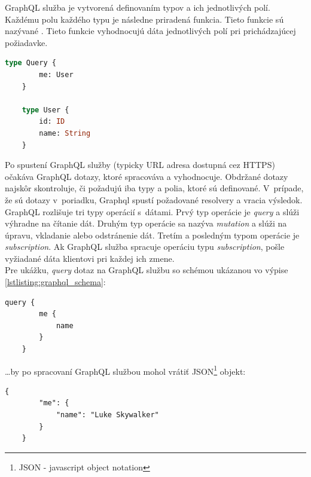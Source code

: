 \noindent GraphQL služba je vytvorená definovaním typov a ich jednotlivých polí. Každému polu každého typu je následne priradená funkcia. \cite{GraphQL} Tieto funkcie sú nazývané . Tieto funkcie vyhodnocujú dáta jednotlivých polí pri prichádzajúcej požiadavke. \\

\begin{lstlisting}[label=lstlisting:graphql_schema, language=GraphQL, caption=Príklad jednoduchej GraphQL schémy. \cite{GraphQL}]
	type Query {
		me: User
	}

	type User {
		id: ID
		name: String
	}
\end{lstlisting}

\medskip

\noindent Po spustení GraphQL služby (typicky URL adresa dostupná cez HTTPS) očakáva GraphQL dotazy, ktoré spracováva a vyhodnocuje. Obdržané dotazy najskôr skontroluje, či požadujú iba typy a polia, ktoré sú definované. V~prípade, že sú dotazy v~poriadku, Graphql spustí požadované resolvery a vracia výsledok. \cite{GraphQL} \\

\noindent GraphQL rozlišuje tri typy operácií s~dátami. Prvý typ operácie je \emph{query} a slúži výhradne na čítanie dát. Druhým typ operácie sa nazýva \emph{mutation} a slúži na úpravu, vkladanie alebo odstránenie dát. Tretím a posledným typom operácie je \emph{subscription}. Ak GraphQL služba spracuje operáciu typu \emph{subscription}, pošle vyžiadané dáta klientovi pri každej ich zmene. \\

\noindent Pre ukážku, \emph{query} dotaz na GraphQL službu so schémou ukázanou vo výpise \ref{lstlisting:graphql_schema}: \\

\begin{lstlisting}[caption=Príklad \emph{query} dotazu na GraphQL službu. \cite{GraphQL}]
	query {
		me {
			name
		}
	}
\end{lstlisting}

\medskip

\ldots by po spracovaní GraphQL službou mohol vrátiť JSON\footnote{JSON - javascript object notation} objekt: \\

\begin{lstlisting}[caption=Príklad dát obdržaných z~GraphQL služby. \cite{GraphQL}]
	{
		"me": {
			"name": "Luke Skywalker"
		}
	}
\end{lstlisting}

